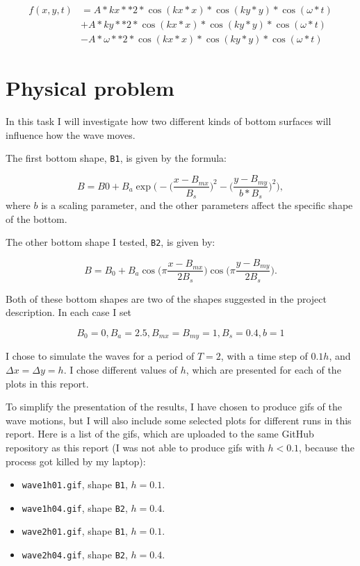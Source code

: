 \documentclass[10pt, a4paper]{amsart}
\numberwithin{figure}{section}
\numberwithin{table}{section}
\begin{document}
\begin{align}
    f(x, y, t) &= A*kx**2*\cos(kx*x)*\cos(ky*y)*\cos(\omega*t)\\
    & + A*ky**2*\cos(kx*x)*\cos(ky*y)*\cos(\omega*t) \\
    &-A*\omega**2*\cos(kx*x)*\cos(ky*y)*\cos(\omega*t)
\end{align}

\section{Physical problem}

In this task I will investigate how two different kinds of bottom surfaces will
influence how the wave moves.

The first bottom shape, \texttt{B1}, is given by the formula:

\begin{equation}
    B = B0 + B_a \exp\big(-\big(\frac{x - B_{mx}}{B_s}\big)^2- \big(\frac{y -
    B_{my}}{b*B_s}\big)^2\big),
\end{equation}
where $b$ is a scaling parameter, and the other parameters affect the specific
shape of the bottom.

The other bottom shape I tested, \texttt{B2}, is given by:

\begin{equation}
    B = B_0 + B_a \cos\big(\pi \frac{x - B_{mx}}{2B_s}\big) \cos\big(\pi
    \frac{y - B_{my}}{2B_s}\big).
\end{equation}

Both of these bottom shapes are two of the shapes suggested in the project
description. In each case I set

$$B_0 = 0, B_a = 2.5, B_{mx} = B_{my} = 1, B_s = 0.4, b = 1$$

I chose to simulate the waves for a period of $T=2$, with a time step of
$0.1 h$, and $\Delta x = \Delta y = h$. I chose different values of $h$, which
are presented for each of the plots in this report.

To simplify the presentation of the results, I have chosen to produce gifs of
the wave motions, but I will also include some selected plots for different
runs in this report. Here is a list of the gifs, which are uploaded to the same
GitHub repository as this report (I was not able to produce gifs with $h <
0.1$, because the process got killed by my laptop):

\begin{itemize}
    \item \texttt{wave1h01.gif}, shape \texttt{B1}, $h=0.1$.
    \item \texttt{wave1h04.gif}, shape \texttt{B2}, $h=0.4$.
    \item \texttt{wave2h01.gif}, shape \texttt{B1}, $h=0.1$.
    \item \texttt{wave2h04.gif}, shape \texttt{B2}, $h=0.4$.
\end{itemize}
\end{document}
